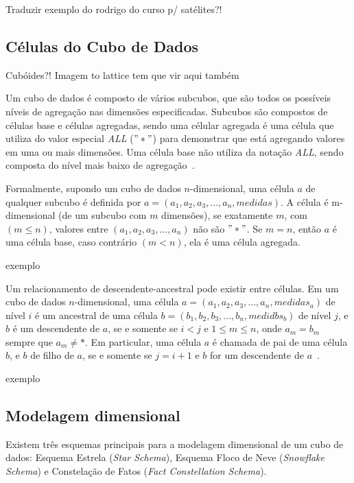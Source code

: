 {\color{red} Traduzir exemplo do rodrigo do curso p/ satélites?!}

\subsection{Células do Cubo de Dados}
\label{ch:fun:cube:cells}

{\color{red} Cubóides?! Imagem to lattice tem que vir aqui também}

Um cubo de dados é composto de vários subcubos, que são todos os possíveis níveis de agregação nas dimensões especificadas.
Subcubos são compostos de células base e células agregadas, sendo uma célular agregada é uma célula que utiliza do valor especial \textit{ALL} ($"*"$) para demonstrar que está agregando valores em uma ou mais dimensões.
Uma célula base não utiliza da notação \textit{ALL}, sendo composta do nível mais baixo de agregação~\cite{limaSEQUENTIALPARALLELAPPROACHES2009}.

Formalmente, supondo um cubo de dados $n$-dimensional, uma célula $a$ de qualquer subcubo é definida por $a = (a_1, a_2, a_3, ..., a_n, medidas)$.
A célula é m-dimensional (de um subcubo com $m$ dimensões), se exatamente $m$, com $(m \leq n)$, valores entre $(a_1, a_2, a_3, ..., a_n)$ não são $"*"$.
Se $m = n$, então $a$ é uma célula base, caso contrário $(m < n)$, ela é uma célula agregada.

{\color{red} exemplo}

Um relacionamento de descendente-ancestral pode existir entre células. 
Em um cubo de dados $n$-dimensional, uma célula $a = (a_1, a_2, a_3, ..., a_n, medidas_a)$ de nível $i$ é um ancestral de uma célula $b = (b_1, b_2, b_3, ..., b_n, medidbs_b)$ de nível $j$, e $b$ é um descendente de $a$, se e somente se $i < j$ e $1 \leq m \leq n$, onde $a_m = b_m$ sempre que $a_m \neq *$.
Em particular, uma célula $a$ é chamada de pai de uma célula $b$, e $b$ de filho de $a$, se e somente se $j = i+1$ e $b$ for um descendente de $a$~\cite{hanDataMiningConcepts2011}.

{\color{red} exemplo}

\subsection{Modelagem dimensional}
\label{ch:fun:cube:dimm}

Existem três esquemas principais para a modelagem dimensional de um cubo de dados: Esquema Estrela (\textit{Star Schema}), Esquema Floco de Neve (\textit{Snowflake Schema}) e Constelação de Fatos (\textit{Fact Constellation Schema}).

